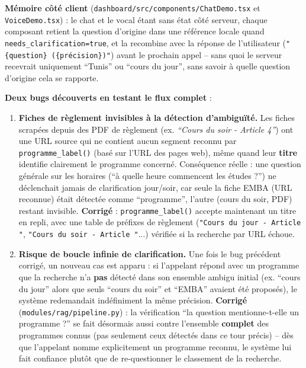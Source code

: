 \documentclass[11pt,a4paper]{report}
\begin{document}
\textbf{Mémoire côté client} (\texttt{dashboard/src/components/ChatDemo.tsx} et
\texttt{VoiceDemo.tsx}) : le chat et le vocal étant sans état côté serveur, chaque
composant retient la question d'origine dans une référence locale quand
\texttt{needs\_clarification=true}, et la recombine avec la réponse de l'utilisateur
(\texttt{"\{question\} (\{précision\})"}) avant le prochain appel -- sans quoi le serveur
recevrait uniquement ``Tunis'' ou ``cours du jour'', sans savoir à quelle question
d'origine cela se rapporte.

\textbf{Deux bugs découverts en testant le flux complet} :
\begin{enumerate}
    \item \textbf{Fiches de règlement invisibles à la détection d'ambiguïté.} Les fiches
    scrapées depuis des PDF de règlement (ex. \emph{``Cours du soir - Article 4''}) ont une
    URL source qui ne contient aucun segment reconnu par \texttt{programme\_label()}
    (basé sur l'URL des pages web), même quand leur \textbf{titre} identifie clairement le
    programme concerné. Conséquence réelle : une question générale sur les horaires
    (``à quelle heure commencent les études ?'') ne déclenchait jamais de clarification
    jour/soir, car seule la fiche EMBA (URL reconnue) était détectée comme
    ``programme'', l'autre (cours du soir, PDF) restant invisible. \textbf{Corrigé} :
    \texttt{programme\_label()} accepte maintenant un titre en repli, avec une table de
    préfixes de règlement (\texttt{"Cours du jour - Article "}, \texttt{"Cours du soir -
    Article "}...) vérifiée si la recherche par URL échoue.
    \item \textbf{Risque de boucle infinie de clarification.} Une fois le bug précédent
    corrigé, un nouveau cas est apparu : si l'appelant répond avec un programme que la
    recherche n'a \textbf{pas} détecté dans son ensemble ambigu initial (ex. ``cours du
    jour'' alors que seuls ``cours du soir'' et ``EMBA'' avaient été proposés), le
    système redemandait indéfiniment la même précision. \textbf{Corrigé}
    (\texttt{modules/rag/pipeline.py}) : la vérification ``la question mentionne-t-elle
    un programme ?'' se fait désormais aussi contre l'ensemble \textbf{complet} des
    programmes connus (pas seulement ceux détectés dans ce tour précis) -- dès que
    l'appelant nomme explicitement un programme reconnu, le système lui fait confiance
    plutôt que de re-questionner le classement de la recherche.
\end{enumerate}
\end{document}
